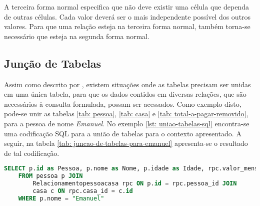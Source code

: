     
A terceira forma normal especifica que não deve existir uma célula que dependa de outras células. Cada valor deverá ser o mais independente possível dos outros valores. Para que uma relação esteja na terceira forma normal, também torna-se necessário que esteja na segunda forma normal.

\subsection{Junção de Tabelas\label{subsection: juncao-tabelas}}
    
Assim como descrito por , existem situações onde as tabelas precisam ser unidas em uma única tabela, para que os dados contidos em diversas relações, que são necessários à consulta formulada, possam ser acessados. Como exemplo disto, pode-se unir as tabelas \ref{tab: pessoa}, \ref{tab: casa} e \ref{tab: total-a-pagar-removido}, para a pessoa de nome \textit{Emanuel}. No exemplo \ref{lst: uniao-tabelas-sql} encontra-se uma codificação SQL para a união de tabelas para o contexto apresentado. A seguir, na tabela \ref{tab: juncao-de-tabelas-para-emanuel} apresenta-se o resultado de tal codificação.


\begin{lstlisting}[language=SQL, caption={União de Tabelas com SQL\label{lst: uniao-tabelas-sql}}]
    SELECT p.id as Pessoa, p.nome as Nome, p.idade as Idade, rpc.valor_mensal as ValorMensal, rpc.quantidade_meses as Meses, c.id as Casa, c.rua as Rua, c.numero as Numero
    FROM pessoa p JOIN
        Relacionamentopessoacasa rpc ON p.id = rpc.pessoa_id JOIN
        casa c ON rpc.casa_id = c.id
    WHERE p.nome = "Emanuel"
\end{lstlisting}

\newpage

